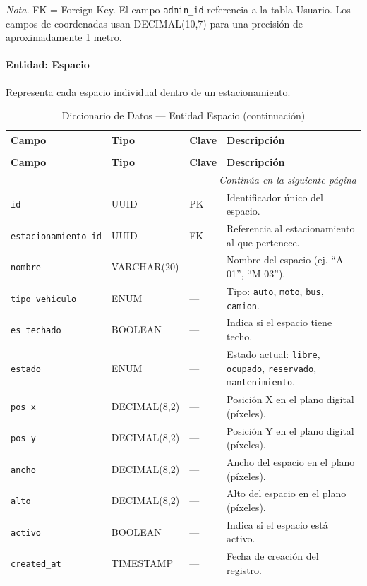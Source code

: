 \textit{Nota.} FK = Foreign Key. El campo \texttt{admin\_id} referencia a la tabla Usuario. Los campos de coordenadas usan DECIMAL(10,7) para una precisión de aproximadamente 1 metro.

\paragraph{Entidad: Espacio} Representa cada espacio individual dentro de un estacionamiento.

\begin{longtable}{p{3.5cm} p{2.5cm} p{1.5cm} p{6.5cm}}
\caption{Diccionario de Datos --- Entidad Espacio} \\
\toprule
\textbf{Campo} & \textbf{Tipo} & \textbf{Clave} & \textbf{Descripción} \\
\midrule
\endfirsthead

\caption[]{Diccionario de Datos --- Entidad Espacio (continuación)} \\
\toprule
\textbf{Campo} & \textbf{Tipo} & \textbf{Clave} & \textbf{Descripción} \\
\midrule
\endhead

\midrule
\multicolumn{4}{r}{\footnotesize\textit{Continúa en la siguiente página}} \\
\endfoot

\bottomrule
\endlastfoot

\texttt{id} & UUID & PK & Identificador único del espacio. \\
\texttt{estacionamiento\_id} & UUID & FK & Referencia al estacionamiento al que pertenece. \\
\texttt{nombre} & VARCHAR(20) & --- & Nombre del espacio (ej. ``A-01'', ``M-03''). \\
\texttt{tipo\_vehiculo} & ENUM & --- & Tipo: \texttt{auto}, \texttt{moto}, \texttt{bus}, \texttt{camion}. \\
\texttt{es\_techado} & BOOLEAN & --- & Indica si el espacio tiene techo. \\
\texttt{estado} & ENUM & --- & Estado actual: \texttt{libre}, \texttt{ocupado}, \texttt{reservado}, \texttt{mantenimiento}. \\
\texttt{pos\_x} & DECIMAL(8,2) & --- & Posición X en el plano digital (píxeles). \\
\texttt{pos\_y} & DECIMAL(8,2) & --- & Posición Y en el plano digital (píxeles). \\
\texttt{ancho} & DECIMAL(8,2) & --- & Ancho del espacio en el plano (píxeles). \\
\texttt{alto} & DECIMAL(8,2) & --- & Alto del espacio en el plano (píxeles). \\
\texttt{activo} & BOOLEAN & --- & Indica si el espacio está activo. \\
\texttt{created\_at} & TIMESTAMP & --- & Fecha de creación del registro. \\
\end{longtable}

